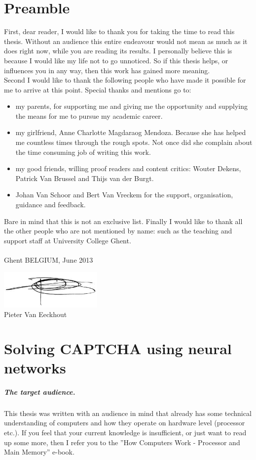 \documentclass[pdftex,a4paper,12pt,twoside]{report}
\theoremstyle{plain} \newtheorem{theorem}{Theorem} \newtheorem{proposition}{Proposition} \newtheorem{lemma}{Lemma} \newtheorem*{corollary}{Corollary}
\theoremstyle{definition} \newtheorem{definition}{Definition} \newtheorem{conjecture}{Conjecture} \newtheorem*{example}{Example} \newtheorem{algorithm}{Algorithm}
\theoremstyle{remark} \newtheorem*{remark}{Remark} \newtheorem*{note}{Note} \newtheorem{case}{Case}
\newcommand{\captchasp}{CAPTCHA }
\newcommand{\studenta}{Pieter {Van Eeckhout}}
\newcommand{\titel}{Solving \captchasp using neural networks}
\begin{document}
\chapter*{Preamble}
\label{ch:preamble}
First, dear reader, I would like to thank you for taking the time to read this thesis. Without an audience this entire endeavour would not mean as much as it does right now, while you are reading its results. I personally believe this is because I would like my life not to go unnoticed. So if this thesis helps, or influences you in any way, then this work has gained more meaning.\\Second I would like to thank the following people who have made it possible for me to arrive at this point. Special thanks and mentions go to:
\begin{itemize}
\item my parents, for supporting me and giving me the opportunity and supplying the means for me to pursue my academic career.
\item my girlfriend, Anne Charlotte Magdaraog Mendoza. Because she has helped me countless times through the rough spots. Not once did she complain about the time consuming job of writing this work.
\item my good friends, willing proof readers and content critics: Wouter Dekens, Patrick Van Brussel and Thijs van der Burgt.
\item Johan Van Schoor and Bert Van Vreckem for the support, organisation, guidance and feedback.
\end{itemize}
Bare in mind that this is not an exclusive list. Finally I would like to thank all the other people who are not mentioned by name: such as the teaching and support staff at University College Ghent.\\\\Ghent BELGIUM, June 2013
\begin{center}
\includegraphics[width=5cm]{./img/signature.png}\\[.5cm]
\studenta
\end{center}
\chapter{\titel}
\label{ch:introduction}
\paragraph{The target audience.}
This thesis was written with an audience in mind that already has some technical understanding of computers and how they operate on hardware level (processor etc.). If you feel that your current knowledge is insufficient, or just want to read up some more, then I refer you to the ''How Computers Work - Processor and Main Memory'' \citep{Young2001} e-book.
\end{document}
